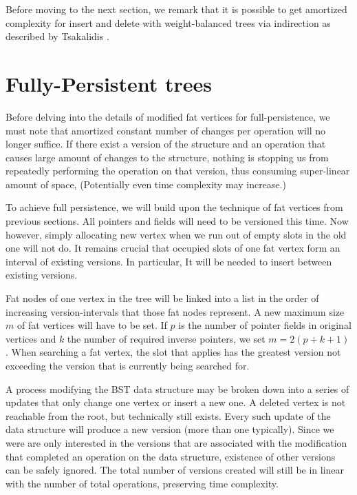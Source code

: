 Before moving to the next section, we remark that it is possible to get  amortized complexity for insert and delete with weight-balanced trees via indirection as described by Tsakalidis \cite{list-ordering}.

\section{Fully-Persistent trees}

Before delving into the details of modified fat vertices for full-persistence, we must note that amortized constant number of changes per operation will no longer suffice. If there exist a version of the structure and an operation that causes large amount of changes to the structure, nothing is stopping us from repeatedly performing the operation on that version, thus consuming super-linear amount of space, (Potentially even time complexity may increase.)

To achieve full persistence, we will build upon the technique of fat vertices from previous sections. All pointers and fields will need to be versioned this time. Now however, simply allocating new vertex when we run out of empty slots in the old one will not do. It remains crucial that occupied slots of one fat vertex form an interval of existing versions. In particular, It will be needed to insert between existing versions.

Fat nodes of one vertex in the tree will be linked into a list in the order of increasing version-intervals that those fat nodes represent. A new maximum size $m$ of fat vertices will have to be set. If $p$ is the number of pointer fields in original vertices and $k$ the number of required inverse pointers, we set $m = 2(p+k+1)$.
When searching a fat vertex, the slot that applies has the greatest version not exceeding the version that is currently being searched for.

A process modifying the BST data structure may be broken down into a series of updates that only change one vertex or insert a new one. A deleted vertex is not reachable from the root, but technically still exists.
Every such update of the data structure will produce a new version (more than one typically). Since we were are only interested in the versions that are associated with the modification that completed an operation on the data structure, existence of other versions can be safely ignored. The total number of versions created will still be in linear with the number of total operations, preserving time complexity.

